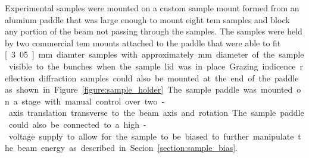 Experimental samples were mounted on a custom sample mount formed from an alumium paddle that was large enough to mount eight \gls{tem} samples and block any portion of the beam not passing through the samples.
The samples were held by two commercial \gls{tem} mounts attached to the paddle that were able to fit \unit[3.05]{mm} diamter samples with approximately \unit[2]{mm} diameter of the sample visible to the bunches when the sample lid was in place.
Grazing indicence reflection diffraction samples could also be mounted at the end of the paddle as shown in Figure~\ref{figure:sample_holder}.
The sample paddle was mounted on a stage with manual control over two-axis translation transverse to the beam axis and rotation.
The sample paddle could also be connected to a high-voltage supply to allow for the sample to be biased to further manipulate the beam energy as described in Secion~\ref{section:sample_bias}.

